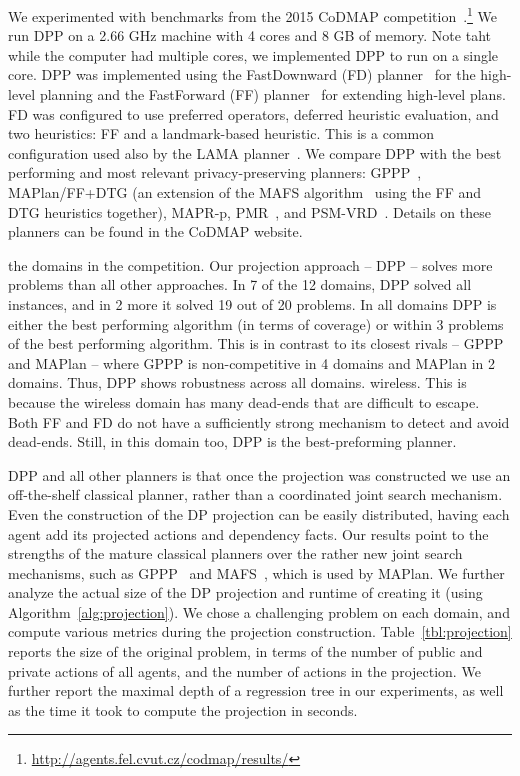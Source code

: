 \documentclass[letterpaper]{article}
\theoremstyle{definition}
\begin{document}
We experimented with benchmarks from the 2015 CoDMAP competition~\cite{vstolba2015competition}.\footnote{\url{http://agents.fel.cvut.cz/codmap/results/}}
We run DPP on a 2.66 GHz machine with 4 cores and 8 GB of memory. Note taht while the computer had multiple cores, we implemented DPP to run on a single core. DPP was
implemented using the FastDownward (FD) planner~\cite{helmert2006fast} for the high-level planning and the FastForward (FF) planner~\cite{hoffmann2001ff} for extending high-level plans. FD was configured to use preferred operators, deferred heuristic evaluation, and two heuristics: FF and a landmark-based heuristic. This is a common configuration used also by the LAMA planner~\cite{richter2010lama}.  We compare DPP with the best performing and most relevant privacy-preserving planners: GPPP~\cite{maliah2015privacy}, MAPlan/FF+DTG (an extension of the MAFS algorithm~\cite{nissim2014distributed} using the FF and DTG heuristics together), MAPR-p, PMR~\cite{luis2014planMerging}, and PSM-VRD~\cite{tovzivcka2014generating,jakubuv2015multiagent}. Details on these planners can be found in the CoDMAP website.

the domains in the competition. Our projection approach -- DPP -- solves more problems than all other approaches. In 7 of the 12 domains, DPP solved all instances, and in 2 more it solved 19 out of 20 problems. In all domains DPP is either the best performing algorithm (in terms of coverage) or within 3 problems of the best performing algorithm. This is in contrast to its closest rivals -- GPPP and MAPlan -- where GPPP is non-competitive in 4 domains and MAPlan in 2 domains. Thus, DPP shows robustness across all domains.  wireless. This is because the wireless domain has many dead-ends that are difficult to escape. Both FF and FD do not have a sufficiently strong mechanism to detect and avoid dead-ends. Still, in this domain too, DPP is the best-preforming planner.

DPP and all other planners is that once the projection was constructed we use an off-the-shelf classical planner, rather than a coordinated joint search mechanism. Even the construction of the DP projection can be easily distributed, having each agent add its projected actions and dependency facts.
Our results point to the strengths of the mature classical planners over the rather new joint search mechanisms, such as GPPP~\cite{maliah2014privacyPreserving} and MAFS~\cite{nissim2014distributed}, which is used by MAPlan.  We further analyze the actual size of the DP projection and runtime of creating it (using Algorithm~\ref{alg:projection}). We chose a challenging problem on each domain, and compute various metrics during the projection construction.  Table~\ref{tbl:projection} reports the size of the original problem, in terms of the number of public and private actions of all agents, and the number of actions in the projection. We further report the maximal depth of a regression tree in our experiments, as well as the time it took to compute the projection in seconds.
\end{document}
